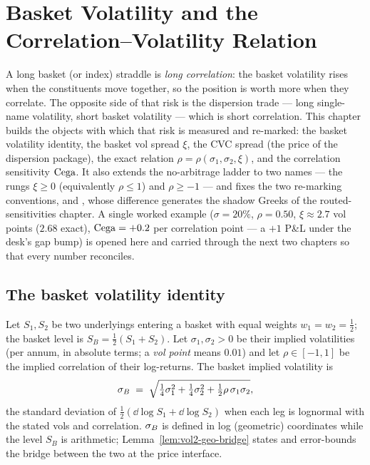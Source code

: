 \mainmatter

\chapter{Basket Volatility and the Correlation--Volatility Relation}
\label{ch:vol2-basket}

A long basket (or index) straddle is \emph{long correlation}: the basket
volatility rises when the constituents move together, so the position is worth
more when they correlate. The opposite side of that risk is the dispersion
trade --- long single-name volatility, short basket volatility --- which is
short correlation. This chapter builds the objects with which that risk is
measured and re-marked: the basket volatility identity, the basket vol spread
$\xi$, the CVC spread (the price of the dispersion package), the exact relation
$\rho = \rho(\sigma_1,\sigma_2,\xi)$, and the correlation sensitivity $\mathrm{Cega}$.
It also extends the no-arbitrage ladder to two names --- the rungs
$\xi \ge 0$ (equivalently $\rho \le 1$) and $\rho \ge -1$ --- and fixes the
two re-marking conventions, \stickyrho{} and \stickycvc, whose difference
generates the shadow Greeks of the routed-sensitivities chapter. A single
worked example ($\sigma = 20\%$, $\rho = 0.50$, $\xi \approx 2.7$ vol points
($2.68$ exact), $\mathrm{Cega} = +0.2$ per correlation point --- a $+1$ P\&L under
the desk's gap bump) is opened here and carried through the next two
chapters so that every number reconciles.

\section{The basket volatility identity}
\label{sec:vol2-basket-identity}

\begin{definition}
\label{def:vol2-basket}
Let $S_1, S_2$ be two underlyings entering a basket with equal weights
$w_1 = w_2 = \tfrac12$; the basket level is $S_B = \tfrac12(S_1 + S_2)$.
Let $\sigma_1, \sigma_2 > 0$ be their implied volatilities (per annum, in
absolute terms; a \emph{vol point} means $0.01$) and let $\rho \in [-1,1]$
be the implied correlation of their log-returns. The basket implied
volatility is
\begin{equation}
\sigma_B \;=\; \sqrt{\tfrac14\sigma_1^2 + \tfrac14\sigma_2^2
          + \tfrac12\rho\,\sigma_1\sigma_2},
\label{eq:vol2-basket-identity}
\end{equation}
the standard deviation of $\tfrac12(\dd\log S_1 + \dd\log S_2)$ when each leg
is lognormal with the stated vols and correlation. $\sigma_B$ is defined in log
(geometric) coordinates while the level $S_B$ is arithmetic;
Lemma~\ref{lem:vol2-geo-bridge} states and error-bounds the bridge between
the two at the price interface.
\end{definition}

